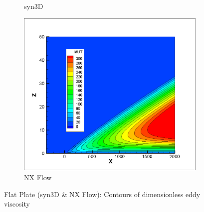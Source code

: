 \begin{figure}[ht!]
\begin{subfigure}{.32\textwidth}
  \caption{syn3D}
\end{subfigure}
\begin{subfigure}{.32\textwidth}
  \centering
  \includegraphics[width=1.0\textwidth]{figs/flatnx/mut_contour.png}
  \caption{NX Flow}
\end{subfigure}
\caption{Flat Plate (syn3D \& NX Flow): Contours of dimensionless eddy viscosity}
\label{fig:flatmutcontour}
\end{figure}

